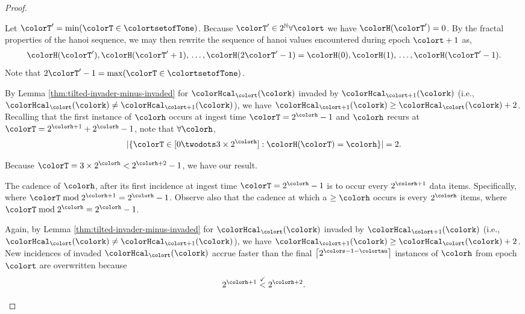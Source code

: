 \begin{proof}
\begin{proofpart}
Let $\colorT' = \min(\colorT \in \colortsetofTone)$.
Because $\colorT' \in 2^{\mathbb{N}} \forall \colort$ we have $\colorH(\colorT') = 0$.
By the fractal properties of the hanoi sequence, we may then rewrite the sequence of hanoi values encountered during epoch $\colort + 1$ as,
\begin{align*}
\colorH(\colorT'), \colorH(\colorT'+1), \,\ldots, \colorH(2\colorT' - 1) = \colorH(0), \colorH(1), \,\ldots, \colorH(\colorT' - 1).
\end{align*}
Note that $2\colorT' - 1 = \max(\colorT \in \colortsetofTone)$.

By Lemma \ref{thm:tilted-invader-minus-invaded} for \hv{} $\colorHcal_{\colort}(\colork)$ invaded by \hv{} $\colorHcal_{\colort + 1}(\colork)$ (i.e., $\colorHcal_{\colort}(\colork) \neq \colorHcal_{\colort + 1}(\colork)$), we have $\colorHcal_{\colort + 1}(\colork) \geq \colorHcal_{\colort}(\colork) + 2$.
Recalling that the first instance of \hv{} $\colorh$ occurs at ingest time $\colorT = 2^{\colorh} - 1$ and \hv{} $\colorh$ recurs at $\colorT = 2^{\colorh + 1} + 2^{\colorh} - 1$, note that $\forall\colorh$,
\begin{align*}
|\{\colorT \in [0 \twodots 3 \times 2^{\colorh}] : \colorH(\colorT) = \colorh\}| = 2.
\end{align*}
\end{proofpart}
Because $\colorT = 3 \times 2^{\colorh} < 2^{\colorh + 2} - 1$, we have our result.

\begin{proofpart}
The cadence of \hv{} $\colorh$, after its first incidence at ingest time $\colorT=2^{\colorh} - 1$ is to occur every $2^{\colorh + 1}$ data items.
Specifically, where $\colorT \bmod 2^{\colorh + 1} = 2^{\colorh} - 1$.
Observe also that the cadence at which a \hv{} $\geq\colorh$ occurs is every $2^{\colorh}$ items, where $\colorT \bmod 2^{\colorh} = 2^{\colorh} - 1$.

Again, by Lemma \ref{thm:tilted-invader-minus-invaded} for \hv{} $\colorHcal_{\colort}(\colork)$ invaded by \hv{} $\colorHcal_{\colort + 1}(\colork)$ (i.e., $\colorHcal_{\colort}(\colork) \neq \colorHcal_{\colort + 1}(\colork)$), we have $\colorHcal_{\colort + 1}(\colork) \geq \colorHcal_{\colort}(\colork) + 2$.
New incidences of invaded \hv{} $\colorHcal_{\colort}(\colork)$ accrue faster than the final $\left\lceil 2^{\colors - 1 - \colortau} \right\rceil$ instances of \hv{} $\colorh$ from epoch $\colort$ are overwritten because
\begin{align*}
2^{\colorh + 1} \stackrel{\checkmark}{<} 2^{\colorh + 2}.
\end{align*}
\end{proofpart}

\end{proof}
